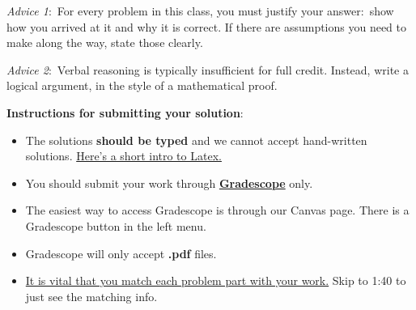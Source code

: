 \documentclass[9pt]{article}
\date{}
\begin{document}
        
        \renewcommand{\headrulewidth}{0.5pt}
        
        \phantom{Test}
        
        \begin{small}
            \textit{Advice 1}:\ For every problem in this class, you must justify your answer:\ show how you arrived at it and why it is correct. If there are assumptions you need to make along the way, state those clearly.
            \vspace{-3mm} 
            
            \textit{Advice 2}:\ Verbal reasoning is typically insufficient for full credit. Instead, write a logical argument, in the style of a mathematical proof.\\
            \vspace{-3mm} 
            
            \textbf{Instructions for submitting your solution}:
            \vspace{-5mm} 
            
            \begin{itemize}
                \item The solutions \textbf{should be typed} and we cannot accept hand-written solutions. \href{http://ece.uprm.edu/~caceros/latex/introduction.pdf}{Here's a short intro to Latex.}
                \item You should submit your work through \href{https://www.gradescope.com/courses/218966}{\textbf{Gradescope}} only.
                \item The easiest way to access Gradescope is through our Canvas page. There is a Gradescope button in the left menu.
                \item Gradescope will only accept \textbf{.pdf} files.
                \item \href{https://www.youtube.com/watch?v=u-pK4GzpId0&feature=emb_logo}{It is vital that you match each problem part with your work.} Skip to 1:40 to just see the matching info.
            \end{itemize}
            \vspace{-4mm} 
        \end{small}
        
\end{document}
